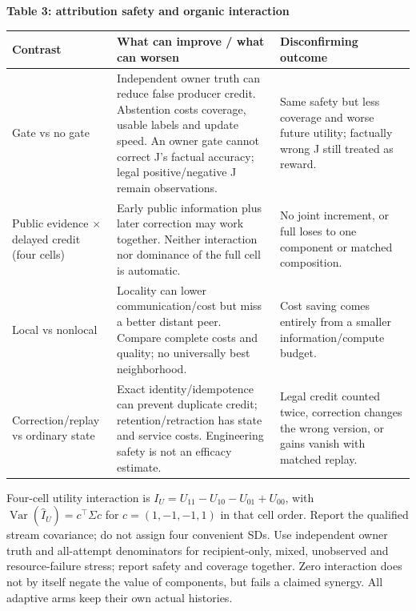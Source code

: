 \documentclass[10pt,a4paper]{article}
\newcommand{\lead}[1]{\vspace{4pt}\textbf{#1}\par}
\begin{document}
\lead{Table 3: attribution safety and organic interaction}
\begin{center}\small
\begin{tabularx}{\linewidth}{@{}L{.23\linewidth}X L{.25\linewidth}@{}}\toprule
Contrast & What can improve / what can worsen & Disconfirming outcome\\\midrule
Gate vs no gate & Independent owner truth can reduce false producer credit. Abstention costs coverage, usable labels and update speed. An owner gate cannot correct J's factual accuracy; legal positive/negative J remain observations. & Same safety but less coverage and worse future utility; factually wrong J still treated as reward.\\
Public evidence $\times$ delayed credit (four cells) & Early public information plus later correction may work together. Neither interaction nor dominance of the full cell is automatic. & No joint increment, or full loses to one component or matched composition.\\
Local vs nonlocal & Locality can lower communication/cost but miss a better distant peer. Compare complete costs and quality; no universally best neighborhood. & Cost saving comes entirely from a smaller information/compute budget.\\
Correction/replay vs ordinary state & Exact identity/idempotence can prevent duplicate credit; retention/retraction has state and service costs. Engineering safety is not an efficacy estimate. & Legal credit counted twice, correction changes the wrong version, or gains vanish with matched replay.\\\bottomrule
\end{tabularx}\end{center}
Four-cell utility interaction is $I_U=U_{11}-U_{10}-U_{01}+U_{00}$, with
$\operatorname{Var}(\widehat I_U)=c^\top\Sigma c$ for $c=(1,-1,-1,1)$ in that
cell order. Report the qualified stream covariance; do not assign four convenient
SDs. Use independent owner truth and all-attempt denominators for recipient-only,
mixed, unobserved and resource-failure stress; report safety and coverage together.
Zero interaction does not by itself negate the value of components, but
fails a claimed synergy. All adaptive arms keep their own actual histories.
\end{document}
